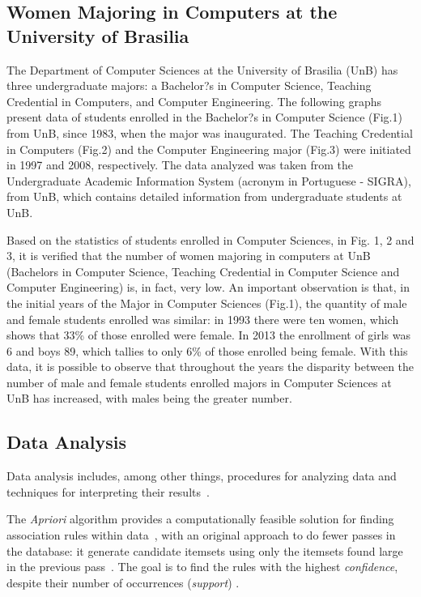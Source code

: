 \subsection{Women Majoring in Computers at the University of Brasilia}

The Department of Computer Sciences at the University of Brasilia (UnB) has three undergraduate majors: a Bachelor?s in Computer Science, Teaching Credential in Computers, and Computer Engineering. 
    The following graphs present data of students enrolled in the Bachelor?s in Computer Science (Fig.1) from UnB, since 1983, when the major was inaugurated. The Teaching Credential in Computers (Fig.2) and the Computer Engineering major (Fig.3) were initiated in 1997 and 2008, respectively. The data analyzed was taken from the Undergraduate Academic Information System (acronym in Portuguese - SIGRA), from UnB, which contains detailed information from undergraduate students at UnB.

Based on the statistics of students enrolled in Computer Sciences, in Fig. 1, 2 and 3, it is verified that the number of women majoring in computers at UnB (Bachelors in Computer Science, Teaching Credential in Computer Science and Computer Engineering) is, in fact, very low. An important observation is that, in the initial years of the Major in Computer Sciences (Fig.1), the quantity of male and female students enrolled was similar: in 1993 there were ten women, which shows that 33\% of those enrolled were female. In 2013 the enrollment of girls was 6 and boys 89, which tallies to only 6\% of those enrolled being female. With this data, it is possible to observe that throughout the years the disparity between the number of male and female students enrolled majors in Computer Sciences at UnB has increased, with males being the greater number.

\subsection{Data Analysis}\label{subsec:background:data}%

Data analysis includes, among other things, procedures for analyzing data and techniques for interpreting their results~\cite{Tukey1962}.

The \emph{Apriori} algorithm provides a computationally feasible solution for finding association rules within data~\cite{Hastie2009}, with an original approach to do fewer passes in the database: it generate candidate itemsets using only the itemsets found large in the previous pass~\cite{Agrawal1994}. The goal is to find the rules with the highest \emph{confidence}, despite their number of occurrences (\emph{support}) \cite{taniar_exception_2008}. 

